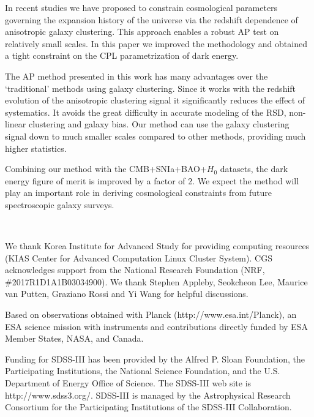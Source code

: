 \documentclass[prl,twocolumn,superscriptaddress,aps,amsmath,amssymb,nofootinbib,altaffilletter]{revtex4}
\begin{document}
In recent studies we have proposed to constrain cosmological parameters 
governing the expansion history of the universe via 
the redshift dependence of anisotropic galaxy clustering\cite{Li2016}.
This approach enables a robust AP test on relatively small scales.
In this paper we improved the methodology and obtained a tight constraint 
on the CPL parametrization of dark energy.

The AP method presented in this work has many advantages over the 
`traditional' methods using galaxy clustering.
Since it works with the redshift evolution of the anisotropic clustering signal it significantly reduces the effect of systematics. 
It avoids the great difficulty in accurate modeling of the RSD, non-linear clustering and galaxy bias.
Our method can use the galaxy clustering signal down to
much smaller scales compared to other methods,
providing much higher statistics.

Combining our method with the CMB+SNIa+BAO+$H_0$ datasets,
the dark energy figure of merit is improved by a factor of 2.
We expect the method will play an important role in deriving cosmological constraints from future spectroscopic galaxy surveys.

\

\begin{acknowledgments}
We thank Korea Institute for Advanced Study for providing computing resources (KIAS Center for Advanced Computation Linux Cluster System).
CGS acknowledges support from the National Research Foundation (NRF,  \#2017R1D1A1B03034900). 
We thank Stephen Appleby, Seokcheon Lee, Maurice van Putten, Graziano Rossi and Yi Wang for helpful discussions.

Based on observations obtained with Planck (http://www.esa.int/Planck), 
an ESA science mission with instruments and contributions directly funded by 
ESA Member States, NASA, and Canada.

Funding for SDSS-III has been provided by the Alfred P. Sloan Foundation, the Participating Institutions, the
National Science Foundation, and the U.S. Department of Energy Office of Science. 
The SDSS-III web site is http://www.sdss3.org/. 
SDSS-III is managed by the Astrophysical Research Consortium for the Participating Institutions
of the SDSS-III Collaboration.
\end{acknowledgments}
\end{document}
